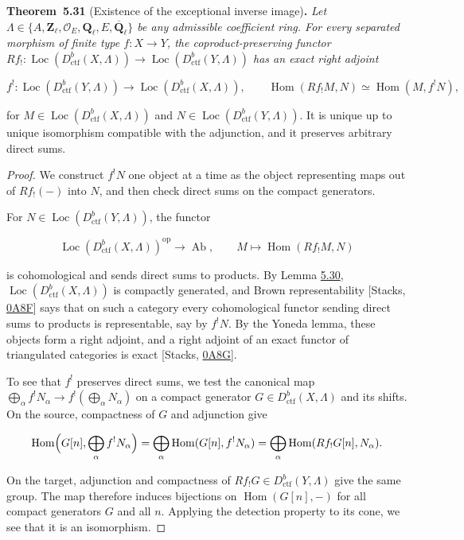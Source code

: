 \documentclass[11pt]{article}
\newenvironment{bpstatement}[2]{\par\addvspace{0.6\baselineskip}\noindent\textbf{#1}#2\textbf{.}\enspace\ignorespaces}
  {\par\addvspace{0.4\baselineskip}}
\newenvironment{bpstatementit}[2]{\begin{bpstatement}{#1}{#2}\itshape\ignorespaces}{\end{bpstatement}}
\providecommand{\Hom}{}\renewcommand{\Hom}{\operatorname{Hom}}
\providecommand{\Loc}{}\renewcommand{\Loc}{\operatorname{Loc}}
\begin{document}
\label{bp506}%
\begin{bpstatementit}{Theorem~5.31}{ (Existence of the exceptional inverse image)}
Let \(\Lambda\in\{A,\mathbf Z_\ell,\mathcal O_E,\mathbf Q_\ell,E,\overline{\mathbf Q}_\ell\}\) be any admissible coefficient ring. For every separated morphism of finite type \(f:X\to Y\), the coproduct-preserving functor \(Rf_!:\Loc(D^b_{\mathrm{ctf}}(X,\Lambda))\to\Loc(D^b_{\mathrm{ctf}}(Y,\Lambda))\) has an exact right adjoint

\[
f^!:\Loc(D^b_{\mathrm{ctf}}(Y,\Lambda))\longrightarrow\Loc(D^b_{\mathrm{ctf}}(X,\Lambda)),
\qquad
\Hom(Rf_!M,N)\simeq\Hom(M,f^!N),
\]

for \(M\in\Loc(D^b_{\mathrm{ctf}}(X,\Lambda))\) and \(N\in\Loc(D^b_{\mathrm{ctf}}(Y,\Lambda))\). It is unique up to unique isomorphism compatible with the adjunction, and it preserves arbitrary direct sums.
\end{bpstatementit}

\begin{proof}[{Proof}]\label{bp507}%
We construct \(f^!N\) one object at a time as the object representing maps out of \(Rf_!(-)\) into \(N\), and then check direct sums on the compact generators.

For \(N\in\Loc(D^b_{\mathrm{ctf}}(Y,\Lambda))\), the functor

\[
\Loc(D^b_{\mathrm{ctf}}(X,\Lambda))^{\mathrm{op}}\longrightarrow\operatorname{Ab},
\qquad M\longmapsto\Hom(Rf_!M,N)
\]

is cohomological and sends direct sums to products. By Lemma \hyperref[bp503]{5.30}, \(\Loc(D^b_{\mathrm{ctf}}(X,\Lambda))\) is compactly generated, and Brown representability [Stacks, \href{https://stacks.math.columbia.edu/tag/0A8F}{0A8F}] says that on such a category every cohomological functor sending direct sums to products is representable, say by \(f^!N\). By the Yoneda lemma, these objects form a right adjoint, and a right adjoint of an exact functor of triangulated categories is exact [Stacks, \href{https://stacks.math.columbia.edu/tag/0A8G}{0A8G}].

To see that \(f^!\) preserves direct sums, we test the canonical map \(\bigoplus_\alpha f^!N_\alpha\to f^!(\bigoplus_\alpha N_\alpha)\) on a compact generator \(G\in D^b_{\mathrm{ctf}}(X,\Lambda)\) and its shifts. On the source, compactness of \(G\) and adjunction give

\[
\Hom\Bigl(G[n],\bigoplus_\alpha f^!N_\alpha\Bigr)
=\bigoplus_\alpha\Hom(G[n],f^!N_\alpha)
=\bigoplus_\alpha\Hom(Rf_!G[n],N_\alpha).
\]

On the target, adjunction and compactness of \(Rf_!G\in D^b_{\mathrm{ctf}}(Y,\Lambda)\) give the same group. The map therefore induces bijections on \(\Hom(G[n],-)\) for all compact generators \(G\) and all \(n\). Applying the detection property to its cone, we see that it is an isomorphism.
\end{proof}
\end{document}
